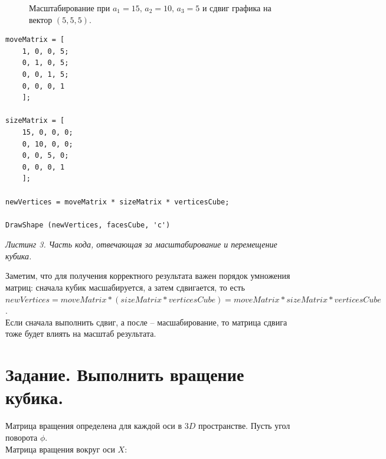 \documentclass[a5paper, 10pt]{article}
\theoremstyle{definition}
\theoremstyle{plain}
\theoremstyle{remark}
\begin{document}
\begin{figure}[h!]
\caption{Масштабирование при $a_1 = 15, \, a_2 = 10, \, a_3 = 5$ и сдвиг графика на вектор $(5, 5, 5)$.}
\end{figure}
\newpage
\begin{center}
\begin{lstlisting}
moveMatrix = [
    1, 0, 0, 5;
    0, 1, 0, 5;
    0, 0, 1, 5;
    0, 0, 0, 1
    ];

sizeMatrix = [
    15, 0, 0, 0;
    0, 10, 0, 0;
    0, 0, 5, 0;
    0, 0, 0, 1
    ];

newVertices = moveMatrix * sizeMatrix * verticesCube;

DrawShape (newVertices, facesCube, 'c')
\end{lstlisting}
\textit{Листинг 3. Часть кода, отвечающая за масштабирование и перемещение кубика.}
\end{center}
Заметим, что для получения корректного результата важен порядок умножения матриц: сначала кубик масшабируется, а затем сдвигается, то есть $newVertices = moveMatrix * (sizeMatrix * verticesCube) = moveMatrix *sizeMatrix * verticesCube$.\\
Если сначала выполнить сдвиг, а после -- масшабирование, то матрица сдвига тоже будет влиять на масштаб результата.

\newpage
\section{Задание. Выполнить вращение кубика.}
Матрица вращения определена для каждой оси в $3D$ пространстве. Пусть угол поворота $\phi$.\\
Матрица вращения вокруг оси $X$:
\end{document}
